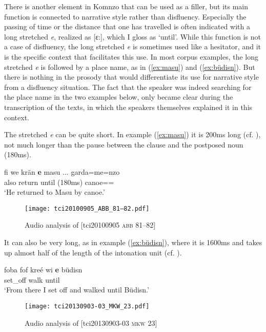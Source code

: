\documentclass[output=paper,colorlinks,citecolor=brown]{langscibook}
\begin{document}
There is another element in Komnzo that can be used as a filler, but its main function is connected to narrative style rather than disfluency. Especially the passing of time or the distance that one has travelled is often indicated with a long stretched \textit{e}, realized as [ɛ:], which I gloss as `until'. While this function is not a case of disfluency, the long stretched \textit{e} is sometimes used like a hesitator, and it is the specific context that facilitates this use. In most corpus examples, the long stretched \textit{e} is followed by a place name, as in (\ref{ex:masu}) and (\ref{ex:büdisn}). But there is nothing in the prosody that would differentiate its use for narrative style from a disfluency situation. The fact that the speaker was indeed searching for the place name in the two examples below, only became clear during the transcription of the texts, in which the speakers themselves explained it in this context. 

The stretched \textit{e} can be quite short. In example (\ref{ex:masu}) it is 200ms long (cf. ), not much longer than the pause between the clause and the postposed noun (180ms).

\ea \label{ex:masu}
    \gll fi we krän \textbf{e} masu ... garda=me=nzo\\
     also return until  (180ms) canoe==\\
    \glt `He returned to Masu by canoe.' 
\z

\begin{figure}
    \texttt{[image: tci20100905\_ABB\_81–82.pdf]}
    \caption{Audio analysis of [tci20100905 \textsc{abb} 81--82]}
    \label{fig:doehler:masu}
\end{figure}

It can also be very long, as in example (\ref{ex:büdisn}), where it is 1600ms and takes up almost half of the length of the intonation unit (cf. ).

\ea \label{ex:büdisn}
    \gll foba fof kreé wi \textbf{e} büdisn\\
      set\_off walk until \\
    \glt `From there I set off and walked until Büdisn.' 
\z

\begin{figure}[h!]
    \texttt{[image: tci20130903-03\_MKW\_23.pdf]}
    \caption{Audio analysis of [tci20130903-03 \textsc{mkw} 23]}
    \label{fig:doehler:büdisn}
\end{figure}
\end{document}
